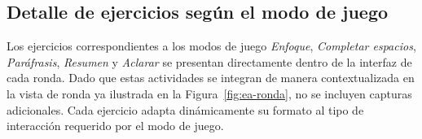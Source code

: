 \subsection*{Detalle de ejercicios según el modo de juego}

\noindent Los ejercicios correspondientes a los modos de juego \textit{Enfoque}, \textit{Completar espacios}, \textit{Paráfrasis}, \textit{Resumen} y \textit{Aclarar} se presentan directamente dentro de la interfaz de cada ronda. Dado que estas actividades se integran de manera contextualizada en la vista de ronda ya ilustrada en la Figura~\ref{fig:ea-ronda}, no se incluyen capturas adicionales. Cada ejercicio adapta dinámicamente su formato al tipo de interacción requerido por el modo de juego.


